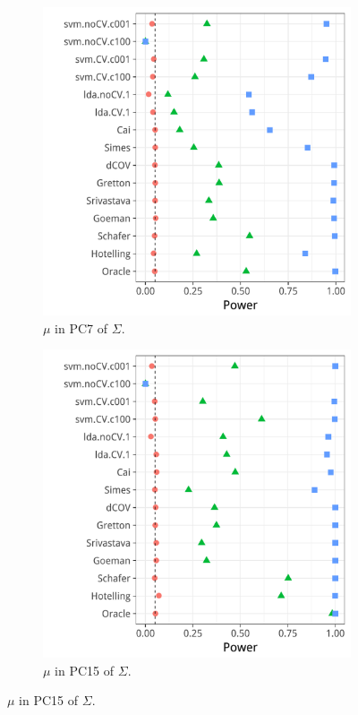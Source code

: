 \documentclass[journal]{IEEEtran}
\begin{document}
\begin{figure}[h]
	\centering
	\caption{Short memory, AR(1) correlation. $\Vert \mu \Vert_2$ fixed. }	
	\label{fig:dependence_4}	
	\begin{subfigure}[t]{.45\columnwidth}
		\centering
		\includegraphics[width=1\columnwidth]{"art/file32"}
		\caption{$\mu$ in PC7 of $\Sigma$.}  
		\label{fig:dependence_41}	
	\end{subfigure}
	\begin{subfigure}[t]{0.45\columnwidth}
		\centering
		\includegraphics[width=1\columnwidth]{"art/file31"}
		\caption{$\mu$ in PC15 of $\Sigma$.}  
		\label{fig:dependence_42}	
	\end{subfigure}
	
\end{figure}
\end{document}

